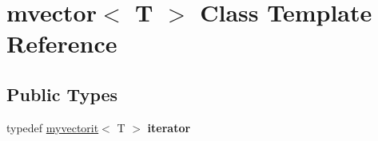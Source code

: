 \hypertarget{classmvector}{}\section{mvector$<$ T $>$ Class Template Reference}
\label{classmvector}
\subsection*{Public Types}
\begin{DoxyCompactItemize}
\item 
\hypertarget{classmvector_a70ffcfd6b41c02cf9fe1921521b01bdc}{}typedef \hyperlink{classmyvectorit}{myvectorit}$<$ T $>$ {\bfseries iterator}\label{classmvector_a70ffcfd6b41c02cf9fe1921521b01bdc}

\end{DoxyCompactItemize}

